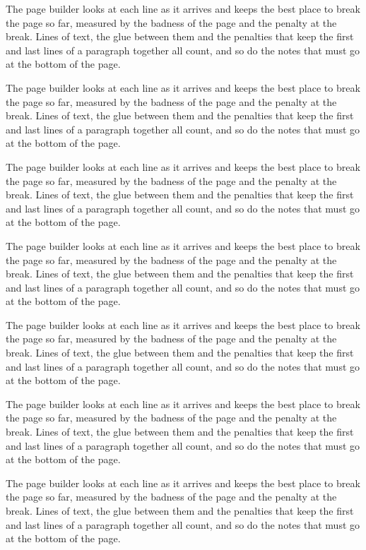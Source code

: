 \documentclass{article}
\begin{document}
The page builder looks at each line as it arrives and keeps the best place to break the page so far, measured by the badness of the page and the penalty at the break. Lines of text, the glue between them and the penalties that keep the first and last lines of a paragraph together all count, and so do the notes that must go at the bottom of the page.

The page builder looks at each line as it arrives and keeps the best place to break the page so far, measured by the badness of the page and the penalty at the break. Lines of text, the glue between them and the penalties that keep the first and last lines of a paragraph together all count, and so do the notes that must go at the bottom of the page.

The page builder looks at each line as it arrives and keeps the best place to break the page so far, measured by the badness of the page and the penalty at the break. Lines of text, the glue between them and the penalties that keep the first and last lines of a paragraph together all count, and so do the notes that must go at the bottom of the page.

The page builder looks at each line as it arrives and keeps the best place to break the page so far, measured by the badness of the page and the penalty at the break. Lines of text, the glue between them and the penalties that keep the first and last lines of a paragraph together all count, and so do the notes that must go at the bottom of the page.

The page builder looks at each line as it arrives and keeps the best place to break the page so far, measured by the badness of the page and the penalty at the break. Lines of text, the glue between them and the penalties that keep the first and last lines of a paragraph together all count, and so do the notes that must go at the bottom of the page.

The page builder looks at each line as it arrives and keeps the best place to break the page so far, measured by the badness of the page and the penalty at the break. Lines of text, the glue between them and the penalties that keep the first and last lines of a paragraph together all count, and so do the notes that must go at the bottom of the page.

The page builder looks at each line as it arrives and keeps the best place to break the page so far, measured by the badness of the page and the penalty at the break. Lines of text, the glue between them and the penalties that keep the first and last lines of a paragraph together all count, and so do the notes that must go at the bottom of the page.
\end{document}
